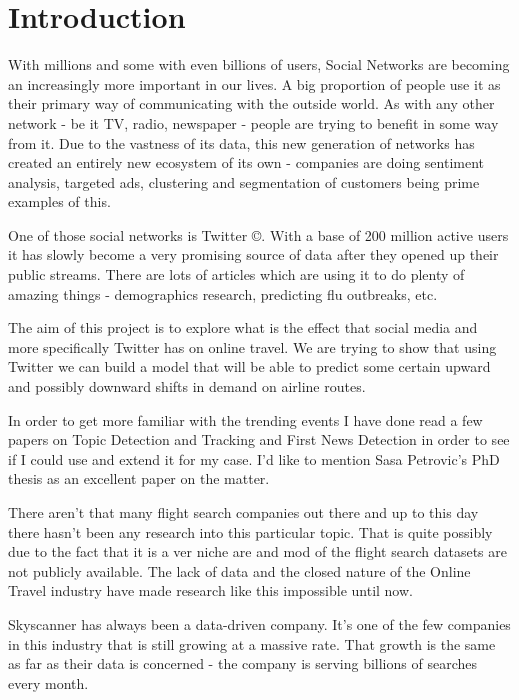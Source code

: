 \documentclass[minf,frontabs,twoside,singlespacing,parskip]{infthesis} %
\begin{document}
\chapter{Introduction}

With millions and some with even billions of users, Social Networks are becoming an increasingly more important in our lives. A big proportion of people use it as their primary way of communicating with the outside world. As with any other network - be it TV, radio, newspaper - people are trying to benefit in some way from it. Due to the vastness of its data, this new generation of networks has created an entirely new ecosystem of its own - companies are doing sentiment analysis, targeted ads, clustering and segmentation of customers being prime examples of this. 

One of those social networks is Twitter {\copyright}. With a base of 200 million active users it has slowly become a very promising source of data after they opened up their public streams. There are lots of articles which are using it to do plenty of amazing things - demographics research, predicting flu outbreaks, etc. \cite{TwitterResearch}

The aim of this project is to explore what is the effect that social media and more specifically Twitter has on online travel. We are trying to show that using Twitter we can build a model that will be able to predict some certain upward and possibly downward shifts in demand on airline routes. 

In order to get more familiar with the trending events I have done read a few papers on Topic Detection and Tracking and First News Detection in order to see if I could use and extend it for my case. I'd like to mention Sasa Petrovic's PhD thesis as an excellent paper on the matter\cite{Petrovic2012}.

There aren't that many flight search companies out there and up to this day there hasn't been any research into this particular topic. That is quite possibly due to the fact that it is a ver niche are and mod of the flight search datasets are not publicly available. The lack of data and the closed nature of the Online Travel industry have made research like this impossible until now. 

Skyscanner has always been a data-driven company. It's one of the few companies in this industry that is still growing at a massive rate. That growth is the same as far as their data is concerned - the company is serving billions of searches every month. 
\end{document}
